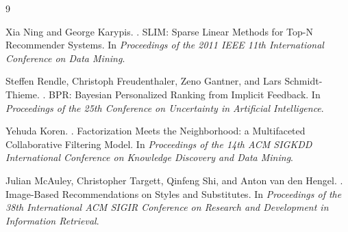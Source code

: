 \documentclass[sigconf,nonacm]{acmart}
\begin{document}
\begin{thebibliography}{9}

Xia Ning and George Karypis.
.
\newblock SLIM: Sparse Linear Methods for Top-N Recommender Systems.
\newblock In \emph{Proceedings of the 2011 IEEE 11th International Conference on Data Mining}.

Steffen Rendle, Christoph Freudenthaler, Zeno Gantner, and Lars Schmidt-Thieme.
.
\newblock BPR: Bayesian Personalized Ranking from Implicit Feedback.
\newblock In \emph{Proceedings of the 25th Conference on Uncertainty in Artificial Intelligence}.

Yehuda Koren.
.
\newblock Factorization Meets the Neighborhood: a Multifaceted Collaborative Filtering Model.
\newblock In \emph{Proceedings of the 14th ACM SIGKDD International Conference on Knowledge Discovery and Data Mining}.

Julian McAuley, Christopher Targett, Qinfeng Shi, and Anton van den Hengel.
.
\newblock Image-Based Recommendations on Styles and Substitutes.
\newblock In \emph{Proceedings of the 38th International ACM SIGIR Conference on Research and Development in Information Retrieval}.

\end{thebibliography}
\end{document}
